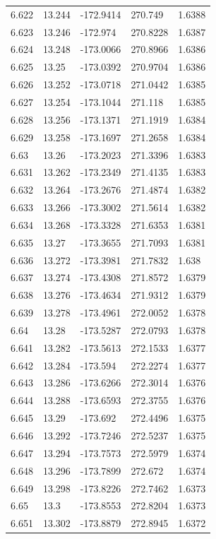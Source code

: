 \begin{tabular}{lllll}
6.622 & 13.244 & -172.9414 & 270.749 & 1.6388 \\
6.623 & 13.246 & -172.974 & 270.8228 & 1.6387 \\
6.624 & 13.248 & -173.0066 & 270.8966 & 1.6386 \\
6.625 & 13.25 & -173.0392 & 270.9704 & 1.6386 \\
6.626 & 13.252 & -173.0718 & 271.0442 & 1.6385 \\
6.627 & 13.254 & -173.1044 & 271.118 & 1.6385 \\
6.628 & 13.256 & -173.1371 & 271.1919 & 1.6384 \\
6.629 & 13.258 & -173.1697 & 271.2658 & 1.6384 \\
6.63 & 13.26 & -173.2023 & 271.3396 & 1.6383 \\
6.631 & 13.262 & -173.2349 & 271.4135 & 1.6383 \\
6.632 & 13.264 & -173.2676 & 271.4874 & 1.6382 \\
6.633 & 13.266 & -173.3002 & 271.5614 & 1.6382 \\
6.634 & 13.268 & -173.3328 & 271.6353 & 1.6381 \\
6.635 & 13.27 & -173.3655 & 271.7093 & 1.6381 \\
6.636 & 13.272 & -173.3981 & 271.7832 & 1.638 \\
6.637 & 13.274 & -173.4308 & 271.8572 & 1.6379 \\
6.638 & 13.276 & -173.4634 & 271.9312 & 1.6379 \\
6.639 & 13.278 & -173.4961 & 272.0052 & 1.6378 \\
6.64 & 13.28 & -173.5287 & 272.0793 & 1.6378 \\
6.641 & 13.282 & -173.5613 & 272.1533 & 1.6377 \\
6.642 & 13.284 & -173.594 & 272.2274 & 1.6377 \\
6.643 & 13.286 & -173.6266 & 272.3014 & 1.6376 \\
6.644 & 13.288 & -173.6593 & 272.3755 & 1.6376 \\
6.645 & 13.29 & -173.692 & 272.4496 & 1.6375 \\
6.646 & 13.292 & -173.7246 & 272.5237 & 1.6375 \\
6.647 & 13.294 & -173.7573 & 272.5979 & 1.6374 \\
6.648 & 13.296 & -173.7899 & 272.672 & 1.6374 \\
6.649 & 13.298 & -173.8226 & 272.7462 & 1.6373 \\
6.65 & 13.3 & -173.8553 & 272.8204 & 1.6373 \\
6.651 & 13.302 & -173.8879 & 272.8945 & 1.6372 \\

\end{tabular}
